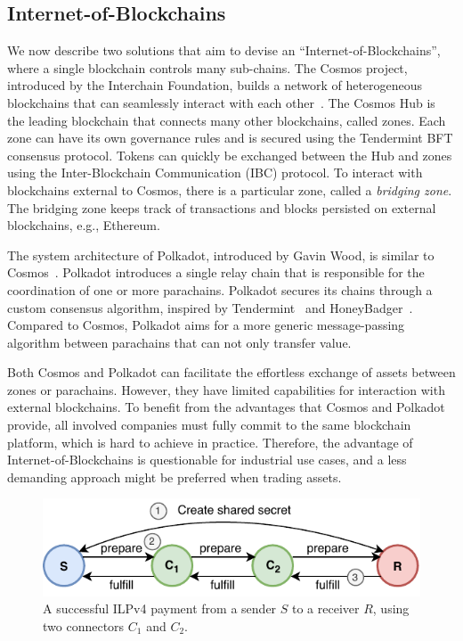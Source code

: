 \subsection{Internet-of-Blockchains}
We now describe two solutions that aim to devise an \enquote{Internet-of-Blockchains}, where a single blockchain controls many sub-chains.
The Cosmos project, introduced by the Interchain Foundation, builds a network of heterogeneous blockchains that can seamlessly interact with each other~\cite{cosmoswhitepaper}.
The Cosmos Hub is the leading blockchain that connects many other blockchains, called zones.
Each zone can have its own governance rules and is secured using the Tendermint BFT consensus protocol.
Tokens can quickly be exchanged between the Hub and zones using the Inter-Blockchain Communication (IBC) protocol.
To interact with blockchains external to Cosmos, there is a particular zone, called a \emph{bridging zone}.
The bridging zone keeps track of transactions and blocks persisted on external blockchains, e.g., Ethereum.

The system architecture of Polkadot, introduced by Gavin Wood, is similar to Cosmos~\cite{wood2016polkadot}.
Polkadot introduces a single relay chain that is responsible for the coordination of one or more parachains.
Polkadot secures its chains through a custom consensus algorithm, inspired by Tendermint~\cite{kwon2014tendermint} and HoneyBadger~\cite{miller2016honey}.
Compared to Cosmos, Polkadot aims for a more generic message-passing algorithm between parachains that can not only transfer value.

Both Cosmos and Polkadot can facilitate the effortless exchange of assets between zones or parachains.
However, they have limited capabilities for interaction with external blockchains.
To benefit from the advantages that Cosmos and Polkadot provide, all involved companies must fully commit to the same blockchain platform, which is hard to achieve in practice.
Therefore, the advantage of Internet-of-Blockchains is questionable for industrial use cases, and a less demanding approach might be preferred when trading assets.

\begin{figure}[t]
	\centering
	\includegraphics[width=.65\linewidth]{xchange/assets/interledger}
	\caption{A successful ILPv4 payment from a sender $ S $ to a receiver $ R $, using two connectors $ C_1 $ and $ C_2 $.}
	\label{fig:interledger}
\end{figure}


